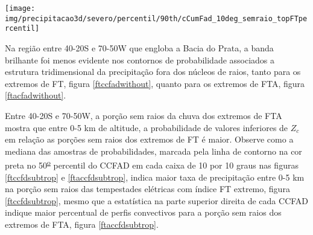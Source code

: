 \begin{sidewaysfigure}%
  \centering
  \texttt{[image: img/precipitacao3d/severo/percentil/90th/cCumFad\_10deg\_semraio\_topFTpercentil]}
  \caption{CCFDs para os extremos de FT. Porção da precipitação sem raios.}
  \label{ftccfadwithout}   
\end{sidewaysfigure} 




Na região entre 40-20S e 70-50W que engloba a Bacia do Prata, a banda brilhante foi menos evidente nos contornos de probabilidade associados a estrutura tridimensional da precipitação fora dos núcleos de raios, tanto para os extremos de FT, figura \ref{ftccfadwithout}, quanto para os extremos de FTA, figura \ref{ftacfadwithout}. 

Entre 40-20S e 70-50W, a porção sem raios da chuva dos extremos de FTA mostra que entre 0-5 km de altitude, a probabilidade de valores inferiores de $Z_c$ em relação as porções sem raios dos extremos de FT é maior. Observe como a mediana das amostras de probabilidades, marcada pela linha de contorno na cor preta no 50\textsuperscript{\underline{o}} percentil do CCFAD em cada caixa de 10 por 10 graus nas figuras \ref{ftccfdsubtrop} e \ref{ftaccfdsubtrop}, indica maior taxa de precipitação entre 0-5 km na porção sem raios das tempestades elétricas com índice FT extremo, figura \ref{ftccfdsubtrop}, mesmo que a estatística na parte superior direita de cada CCFAD indique maior percentual de perfis convectivos para a porção sem raios dos extremos de FTA, figura \ref{ftaccfdsubtrop}.





